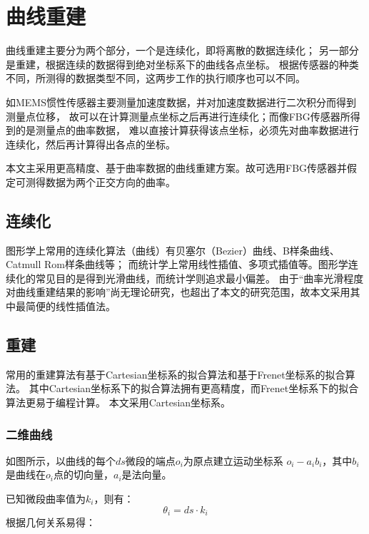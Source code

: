 \cleardoublepage

\section{曲线重建}

曲线重建主要分为两个部分，一个是连续化，即将离散的数据连续化；
另一部分是重建，根据连续的数据得到绝对坐标系下的曲线各点坐标。
根据传感器的种类不同，所测得的数据类型不同，这两步工作的执行顺序也可以不同。

如MEMS惯性传感器主要测量加速度数据，并对加速度数据进行二次积分而得到测量点位移，
故可以在计算测量点坐标之后再进行连续化；而像FBG传感器所得到的是测量点的曲率数据，
难以直接计算获得该点坐标，必须先对曲率数据进行连续化，然后再计算得出各点的坐标。

本文主采用更高精度、基于曲率数据的曲线重建方案。故可选用FBG传感器并假定可测得数据为两个正交方向的曲率。

\subsection{连续化}
图形学上常用的连续化算法（曲线）有贝塞尔（Bezier）曲线、B样条曲线、Catmull Rom样条曲线等；
而统计学上常用线性插值、多项式插值等。图形学连续化的常见目的是得到光滑曲线，而统计学则追求最小偏差。
由于“曲率光滑程度对曲线重建结果的影响”尚无理论研究，也超出了本文的研究范围，故本文采用其中最简便的线性插值法。

\subsection{重建}
常用的重建算法有基于Cartesian坐标系的拟合算法和基于Frenet坐标系的拟合算法。
其中Cartesian坐标系下的拟合算法拥有更高精度，而Frenet坐标系下的拟合算法更易于编程计算。
本文采用Cartesian坐标系。

\subsubsection{二维曲线}

\begin{center}
    
\end{center}

如图所示，以曲线的每个$ds$微段的端点$o_i$为原点建立运动坐标系 $o_i-a_ib_i$，其中$b_i$是曲线在$o_i$点的切向量，$a_i$是法向量。

已知微段曲率值为$k_i$，则有：
\begin{equation}
\theta_i = ds\cdot k_i
\end{equation}
根据几何关系易得：

